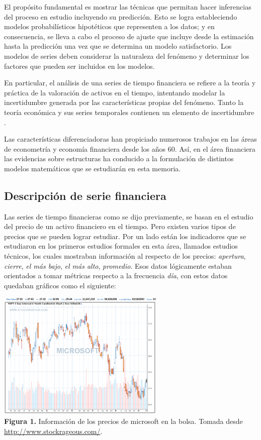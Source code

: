 El propósito fundamental es mostrar las técnicas que permitan hacer inferencias del
proceso en estudio incluyendo su predicción. Esto se logra estableciendo modelos
probabilísticos hipotéticos que representen a los datos; y en consecuencia, se lleva a cabo el
proceso de ajuste que incluye desde la estimación hasta la predicción una vez que se determina
un modelo satisfactorio. Los modelos de series deben considerar la naturaleza del fenómeno y determinar 
los factores que pueden ser incluidos en los modelos.

En particular, el análisis de una series de tiempo financiera se refiere a la teoría y práctica de la valoración 
de activos en el tiempo, intentando modelar la incertidumbre generada por las características propias del fenómeno. Tanto la teoría económica 
y sus series temporales contienen un elemento de incertidumbre \cite{tsay2005analysis}. 

Las características diferenciadoras han propiciado numerosos trabajos en las áreas de econometría y economía financiera desde los años 60.
Así, en el área financiera las evidencias sobre estructuras ha conducido a la formulación de distintos modelos matemáticos que se estudiarán
en esta memoria.

\subsection{Descripción de serie financiera}

Las series de tiempo financieras como se dijo previamente, se basan en el estudio del precio de un activo financiero en el tiempo. Pero existen 
varios tipos de precios que se pueden lograr estudiar. Por un lado están los indicadores que se estudiaron en los primeros estudios formales
en esta área, llamados estudios técnicos, los cuales mostraban información al respecto de los precios: \emph{apertura}, \emph{cierre}, \emph{el más bajo}, 
\emph{el más alto}, \emph{promedio}. Esos datos lógicamente estaban orientados a tomar métricas respecto a la frecuencia \emph{día}, con estos
datos quedaban gráficos como el siguiente:

\begin{center}
	\includegraphics[width=0.6\textwidth]{images/microsoft} \\
	\textbf{Figura 1.} Información de los precios de microsoft en la bolsa. Tomada desde \url{http://www.stockrageous.com/}.
\end{center}

